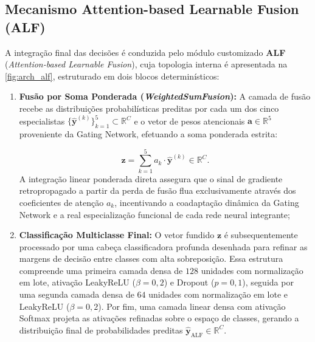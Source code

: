 \subsection{Mecanismo Attention-based Learnable Fusion (ALF)}
\label{subsec:mecanismo_alf}

A integração final das decisões é conduzida pelo módulo customizado \textbf{ALF} 
(\emph{Attention-based Learnable Fusion}), cuja topologia interna é apresentada na \ref{fig:arch_alf}, estruturado em 
dois blocos determinísticos:

\begin{enumerate}

    \item \textbf{Fusão por Soma Ponderada (\emph{WeightedSumFusion}):}
    A camada de fusão recebe as distribuições probabilísticas preditas por cada um dos cinco especialistas 
    $\{\hat{\mathbf{y}}^{(k)}\}_{k=1}^5 \subset \mathbb{R}^C$ e o vetor de pesos atencionais $\mathbf{a} \in 
    \mathbb{R}^5$ proveniente da Gating Network, efetuando a soma ponderada estrita:
    
    \begin{equation}
    \label{eq:alf_weighted_sum}
    \mathbf{z} = \sum_{k=1}^5 a_k \cdot \hat{\mathbf{y}}^{(k)} \in \mathbb{R}^C.
    \end{equation}
    A integração linear ponderada direta assegura que o sinal de gradiente retropropagado a partir da perda de fusão 
    flua exclusivamente através dos coeficientes de atenção $a_k$, incentivando a coadaptação dinâmica da Gating Network
    e a real especialização funcional de cada rede neural integrante;
    
    \item \textbf{Classificação Multiclasse Final:}
    O vetor fundido $\mathbf{z}$ é subsequentemente processado por uma cabeça classificadora profunda desenhada para 
    refinar as margens de decisão entre classes com alta sobreposição. Essa estrutura compreende uma primeira camada 
    densa de $128$ unidades com normalização em lote, ativação LeakyReLU ($\beta=0{,}2$) e Dropout ($p=0{,}1$), seguida
    por uma segunda camada densa de $64$ unidades com normalização em lote e LeakyReLU ($\beta=0{,}2$). Por fim, uma 
    camada linear densa com ativação Softmax projeta as ativações refinadas sobre o espaço de classes, gerando a 
    distribuição final de probabilidades preditas $\hat{\mathbf{y}}_{\mathrm{ALF}} \in \mathbb{R}^C$.

\end{enumerate}

